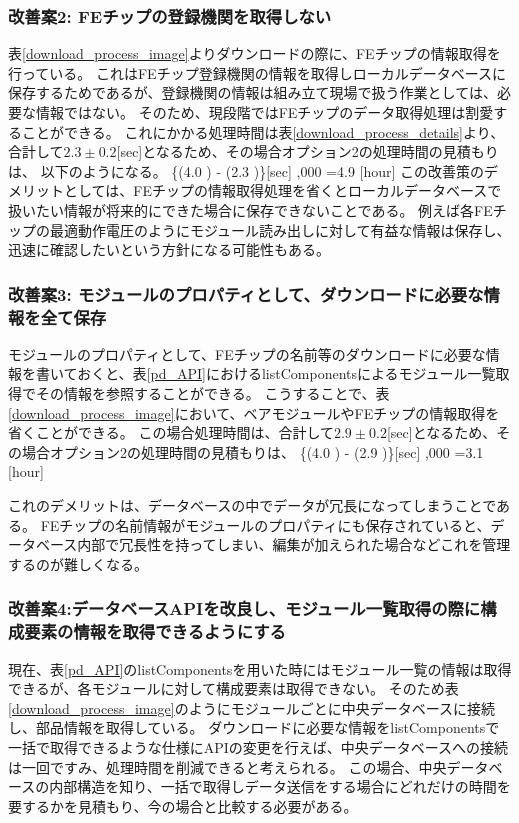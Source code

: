 \subsubsection{改善案2: FEチップの登録機関を取得しない}
表\ref{download_process_image}よりダウンロードの際に、FEチップの情報取得を行っている。
これはFEチップ登録機関の情報を取得しローカルデータベースに保存するためであるが、登録機関の情報は組み立て現場で扱う作業としては、必要な情報ではない。
そのため、現段階ではFEチップのデータ取得処理は割愛することができる。
これにかかる処理時間は表\ref{download_process_details}より、合計して$2.3\pm0.2$[sec]となるため、その場合オプション2の処理時間の見積もりは、
以下のようになる。
\bbb
\{(4.0 ) - (2.3 )\}[\rm{sec}] ,000 =4.9  [{\rm hour}]
\eee
この改善策のデメリットとしては、FEチップの情報取得処理を省くとローカルデータベースで扱いたい情報が将来的にできた場合に保存できないことである。
例えば各FEチップの最適動作電圧のようにモジュール読み出しに対して有益な情報は保存し、迅速に確認したいという方針になる可能性もある。

\subsubsection{改善案3: モジュールのプロパティとして、ダウンロードに必要な情報を全て保存}
モジュールのプロパティとして、FEチップの名前等のダウンロードに必要な情報を書いておくと、表\ref{pd_API}におけるlistComponentsによるモジュール一覧取得でその情報を参照することができる。
こうすることで、表\ref{download_process_image}において、ベアモジュールやFEチップの情報取得を省くことができる。
この場合処理時間は、合計して$2.9\pm0.2$[sec]となるため、その場合オプション2の処理時間の見積もりは、
\bbb
\{(4.0 ) - (2.9 )\}[\rm{sec}] ,000 =3.1  [{\rm hour}] 
\eee

これのデメリットは、データベースの中でデータが冗長になってしまうことである。
FEチップの名前情報がモジュールのプロパティにも保存されていると、データベース内部で冗長性を持ってしまい、編集が加えられた場合などこれを管理するのが難しくなる。

\subsubsection{改善案4:データベースAPIを改良し、モジュール一覧取得の際に構成要素の情報を取得できるようにする}
現在、表\ref{pd_API}のlistComponentsを用いた時にはモジュール一覧の情報は取得できるが、各モジュールに対して構成要素は取得できない。
そのため表\ref{download_process_image}のようにモジュールごとに中央データベースに接続し、部品情報を取得している。
ダウンロードに必要な情報をlistComponentsで一括で取得できるような仕様にAPIの変更を行えば、中央データベースへの接続は一回ですみ、処理時間を削減できると考えられる。
この場合、中央データベースの内部構造を知り、一括で取得しデータ送信をする場合にどれだけの時間を要するかを見積もり、今の場合と比較する必要がある。\\


